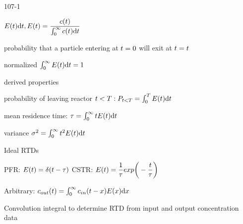 \begin{mitframe}{107-1}
\begin{listone}
	\item $\energy(\timet)\mathrm{d}\timet,\energy(\timet)=\dfrac{c(\timet)}{\int_{\init}^{\infty}c(\timet)\mathrm{d}\timet}$
    	\begin{listtwo}
        	\item probability that a particle entering at $\timet=0$ will exit at $\timet=\timet$
            \item normalized $\int_{\init}^{\infty}\energy(\timet)\mathrm{d}\timet=1$
            \item derived properties
            	\begin{listthree}
                	\item probability of leaving reactor $\timet<\Temp:\p_{\timet<\Temp}=\int_{\init}^{\Temp}\energy(\timet)\mathrm{d}\timet$
                    \item mean residence time: $\torque=\int_{\init}^{\infty}\timet\energy(\timet)\mathrm{d}\timet$
                    \item variance $\molecrad^2=\int_{\init}^{\infty}\timet^2\energy(\timet)\mathrm{d}\timet$
                \end{listthree}
        \end{listtwo}
	\item Ideal RTDs
    	\begin{listtwo}
        	\item PFR: $\energy(\timet)=\blthick(\timet-\torque)$     CSTR: $\energy(\timet)=\dfrac{1}{\torque}exp\bigg(-\dfrac{\timet}{\torque}\bigg)$
            \item Arbitrary: $c_{out}(\timet)=\int_{\init}^{\infty}{c}_{in}(\timet-\disp)\energy(\disp)\mathrm{d}\disp$
            \begin{listthree}
            	\item Convolution integral to determine RTD from input and output concentration data
            \end{listthree}
        \end{listtwo}
\end{listone}    
\end{mitframe}